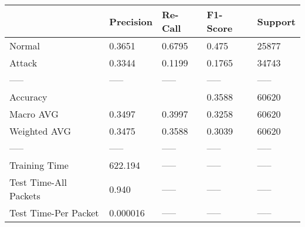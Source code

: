 \begin{tabular}{lllll}
\toprule
{} & Precision & Re-Call & F1-Score & Support \\
\midrule
Normal                &    0.3651 &  0.6795 &    0.475 &   25877 \\
Attack                &    0.3344 &  0.1199 &   0.1765 &   34743 \\
-----                 &     ----- &   ----- &    ----- &   ----- \\
Accuracy              &           &         &   0.3588 &   60620 \\
Macro AVG             &    0.3497 &  0.3997 &   0.3258 &   60620 \\
Weighted AVG          &    0.3475 &  0.3588 &   0.3039 &   60620 \\
-----                 &     ----- &   ----- &    ----- &   ----- \\
Training Time         &   622.194 &   ----- &    ----- &   ----- \\
Test Time-All Packets &     0.940 &   ----- &    ----- &   ----- \\
Test Time-Per Packet  &  0.000016 &   ----- &    ----- &   ----- \\
\bottomrule
\end{tabular}
